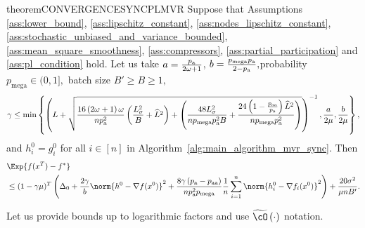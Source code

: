 \documentclass{article}
\newcommand*{\probavailable}{\ensuremath{p_{\textnormal{a}}}}
\newcommand*{\probpairaa}{\ensuremath{p_{\textnormal{aa}}}}
\newcommand*{\probmega}{\ensuremath{p_{\text{mega}}}}
\begin{document}
  \begin{restatable}{theorem}{CONVERGENCESYNCPLMVR}
    \label{theorem:sync_stochastic_pl}
    Suppose that Assumptions \ref{ass:lower_bound}, \ref{ass:lipschitz_constant}, \ref{ass:nodes_lipschitz_constant}, \ref{ass:stochastic_unbiased_and_variance_bounded}, \ref{ass:mean_square_smoothness}, \ref{ass:compressors}, \ref{ass:partial_participation} and \ref{ass:pl_condition} hold. Let us take $a = \frac{\probavailable}{2\omega + 1}$, $b = \frac{\probmega \probavailable}{2 - \probavailable},$probability $\probmega \in (0, 1],$ batch size $B' \geq B \geq 1,$ $$\gamma \leq \min\left\{\left(L + \sqrt{\frac{16 \left(2 \omega + 1\right)\omega}{n \probavailable^2}\left(\frac{L_{\sigma}^2}{B} + \widehat{L}^2\right) + \left(\frac{48 L_{\sigma}^2}{n \probmega \probavailable^2 B} + \frac{24 \left(1 - \frac{\probpairaa}{\probavailable}\right) \widehat{L}^2}{n \probmega \probavailable^2}\right)}\right)^{-1}, \frac{a}{2\mu} , \frac{b}{2\mu}\right\},$$ and $h^{0}_i = g^{0}_i$ for all $i \in [n]$
    in Algorithm~\ref{alg:main_algorithm_mvr_sync}. Then 
    \begin{align*}
      &\Exp{f(x^{T}) - f^*} \\
      &\leq (1 - \gamma \mu)^{T}\left(\Delta_0 + \frac{2 \gamma}{b} \norm{h^{0} - \nabla f(x^{0})}^2 + \frac{8 \gamma \left(\probavailable - \probpairaa\right)}{n \probavailable^2 \probmega}\frac{1}{n}\sum_{i=1}^n\norm{h^{0}_i - \nabla f_i(x^{0})}^2\right) + \frac{20 \sigma^2}{\mu n B'}.
    \end{align*}
  \end{restatable}

  Let us provide bounds up to logarithmic factors and use $\widetilde{\cO}\left(\cdot\right)$ notation.
\end{document}
